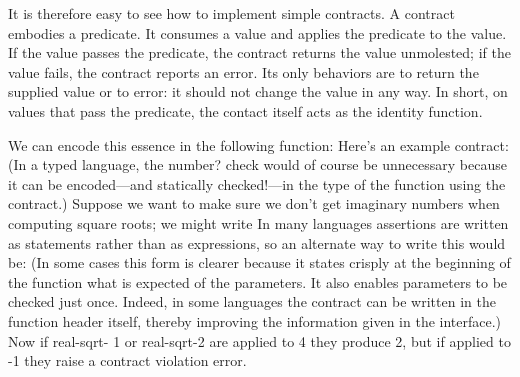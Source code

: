 
It is therefore easy to see how to implement simple contracts. A contract
embodies a predicate. It consumes a value and applies the predicate to the
value. If the value passes the predicate, the contract returns the value
unmolested; if the value fails, the contract reports an error. Its only
behaviors are to return the supplied value or to error: it should not change the
value in any way. In short, on values that pass the predicate, the contact
itself acts as the identity function.

We can encode this essence in the following function:
Here’s an example contract:
(In a typed language, the number? check would of course be unnecessary because
it can be encoded—and statically checked!—in the type of the function using the
contract.) Suppose we want to make sure we don’t get imaginary numbers when
computing square roots; we might write
In many languages assertions are written as statements rather than as
expressions, so an alternate way to write this would be:
(In some cases this form is clearer because it states crisply at the beginning
of the function what is expected of the parameters. It also enables parameters
to be checked just once. Indeed, in some languages the contract can be written
in the function header itself, thereby improving the information given in the
interface.) Now if real-sqrt- 1 or real-sqrt-2 are applied to 4 they produce 2,
but if applied to -1 they raise a contract violation error.
